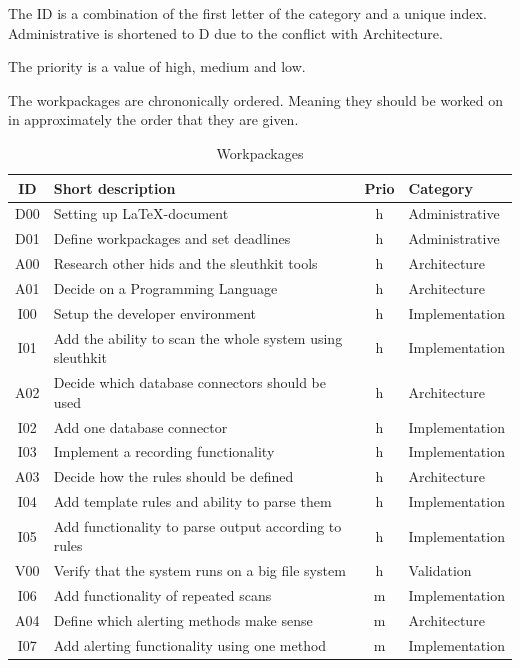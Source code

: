 \documentclass[
	a4paper,					%
	10pt,							%
	twoside,					%
	openright,				%
	notitlepage,			%
	parskip=half,			%
]{scrreprt}					%
\begin{document}
The ID is a combination of the first letter of the category and a unique index. Administrative is shortened to D due to the conflict with Architecture.

The priority is a value of high, medium and low. 

The workpackages are chrononically ordered. Meaning they should be worked on in approximately the order that they are given. 

\begin{table}[h!]
  \begin{center}
    \caption{Workpackages}
    \label{tab:workpackages}
    \begin{tabular}{c|l|c|l}
      \textbf{ID} & \textbf{Short description} & \textbf{Prio} & \textbf{Category} \\
      \hline
      D00 & Setting up \LaTeX -document & h & Administrative \\
      D01 & Define workpackages and set deadlines & h & Administrative \\
			A00 & Research other \gls{hids} and the sleuthkit tools & h & Architecture \\
			A01 & Decide on a Programming Language & h & Architecture \\
			I00 & Setup the developer environment & h & Implementation \\
			I01 & Add the ability to scan the whole system using sleuthkit & h & Implementation \\
			A02 & Decide which database connectors should be used & h & Architecture \\
			I02 & Add one database connector & h & Implementation \\
			I03 & Implement a recording functionality & h & Implementation \\
			A03 & Decide how the rules should be defined & h & Architecture \\
			I04 & Add template rules and ability to parse them & h & Implementation \\
			I05 & Add functionality to parse output according to rules & h & Implementation \\
			V00 & Verify that the system runs on a big file system & h & Validation \\
			I06 & Add functionality of repeated scans & m & Implementation \\
			A04 & Define which alerting methods make sense & m & Architecture \\ 
			I07 & Add alerting functionality using one method & m & Implementation \\

\end{tabular}
\end{center}
\end{table}
\end{document}
